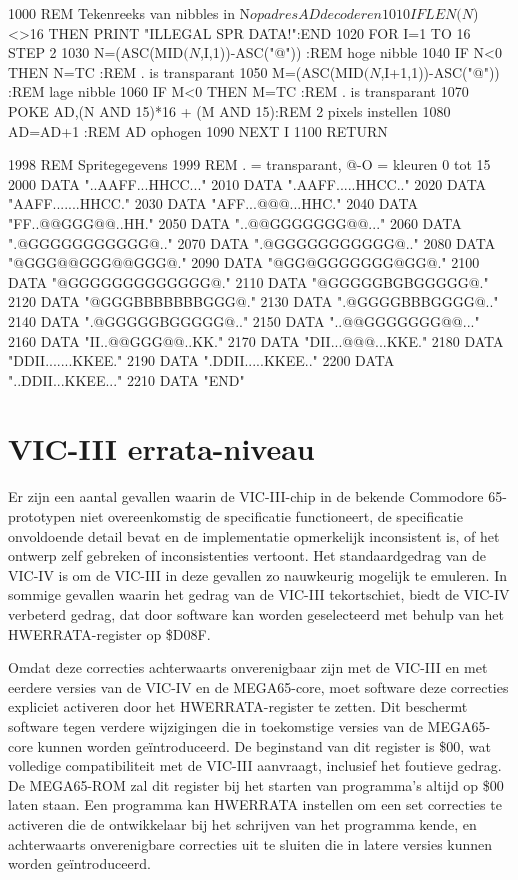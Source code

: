 \begin{screencode}
1000 REM Tekenreeks van nibbles in N$ op adres AD decoderen
1010 IF LEN(N$)<>16 THEN PRINT "ILLEGAL SPR DATA!":END
1020 FOR I=1 TO 16 STEP 2
1030 N=(ASC(MID$(N$,I,1))-ASC("@"))    :REM hoge nibble
1040 IF N<0 THEN N=TC                  :REM . is transparant
1050 M=(ASC(MID$(N$,I+1,1))-ASC("@"))  :REM lage nibble
1060 IF M<0 THEN M=TC                  :REM . is transparant
1070 POKE AD,(N AND 15)*16 + (M AND 15):REM 2 pixels instellen
1080 AD=AD+1                           :REM AD ophogen
1090 NEXT I
1100 RETURN

1998 REM Spritegegevens
1999 REM . = transparant, @-O = kleuren 0 tot 15
2000 DATA "..AAFF...HHCC..."
2010 DATA ".AAFF.....HHCC.."
2020 DATA "AAFF.......HHCC."
2030 DATA "AFF...@@@...HHC."
2040 DATA "FF..@@GGG@@..HH."
2050 DATA "..@@GGGGGGG@@..."
2060 DATA ".@GGGGGGGGGGG@.."
2070 DATA ".@GGGGGGGGGGG@.."
2080 DATA "@GGG@@GGG@@GGG@."
2090 DATA "@GG@GGGGGGG@GG@."
2100 DATA "@GGGGGGGGGGGGG@."
2110 DATA "@GGGGGBGBGGGGG@."
2120 DATA "@GGGBBBBBBBGGG@."
2130 DATA ".@GGGGBBBGGGG@.."
2140 DATA ".@GGGGGBGGGGG@.."
2150 DATA "..@@GGGGGGG@@..."
2160 DATA "II..@@GGG@@..KK."
2170 DATA "DII...@@@...KKE."
2180 DATA "DDII.......KKEE."
2190 DATA ".DDII.....KKEE.."
2200 DATA "..DDII...KKEE..."
2210 DATA "END"
\end{screencode}
\clearpage

\section{VIC-III errata-niveau}

Er zijn een aantal gevallen waarin de VIC-III-chip in de bekende Commodore 65-prototypen niet overeenkomstig de specificatie functioneert, de specificatie onvoldoende detail bevat en de implementatie opmerkelijk inconsistent is, of het ontwerp zelf gebreken of inconsistenties vertoont. Het standaardgedrag van de VIC-IV is om de VIC-III in deze gevallen zo nauwkeurig mogelijk te emuleren. In sommige gevallen waarin het gedrag van de VIC-III tekortschiet, biedt de VIC-IV verbeterd gedrag, dat door software kan worden geselecteerd met behulp van het HWERRATA-register op \$D08F.

Omdat deze correcties achterwaarts onverenigbaar zijn met de VIC-III en met eerdere versies van de VIC-IV en de MEGA65-core, moet software deze correcties expliciet activeren door het HWERRATA-register te zetten. Dit beschermt software tegen verdere wijzigingen die in toekomstige versies van de MEGA65-core kunnen worden geïntroduceerd. De beginstand van dit register is \$00, wat volledige compatibiliteit met de VIC-III aanvraagt, inclusief het foutieve gedrag. De MEGA65-ROM zal dit register bij het starten van programma's altijd op \$00 laten staan. Een programma kan HWERRATA instellen om een set correcties te activeren die de ontwikkelaar bij het schrijven van het programma kende, en achterwaarts onverenigbare correcties uit te sluiten die in latere versies kunnen worden geïntroduceerd.

